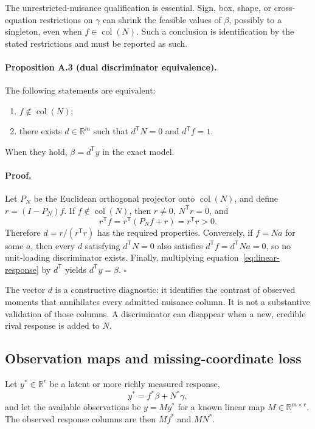 The unrestricted-nuisance qualification is essential. Sign, box, shape, or
cross-equation restrictions on \(\gamma\) can shrink the feasible values of
\(\beta\), possibly to a singleton, even when \(f\in\operatorname{col}(N)\).
Such a conclusion is identification by the stated restrictions and must be
reported as such.

\paragraph{Proposition A.3 (dual discriminator equivalence).}
The following statements are equivalent:
\begin{enumerate}
  \item \(f\notin\operatorname{col}(N)\);
  \item there exists \(d\in\mathbb R^m\) such that
        \(d^{\mathsf T}N=0\) and \(d^{\mathsf T}f=1\).
\end{enumerate}
When they hold, \(\beta=d^{\mathsf T}y\) in the exact model.

\paragraph{Proof.}
Let \(P_N\) be the Euclidean orthogonal projector onto
\(\operatorname{col}(N)\), and define \(r=(I-P_N)f\). If
\(f\notin\operatorname{col}(N)\), then \(r\neq0\),
\(N^{\mathsf T}r=0\), and
\[
  r^{\mathsf T}f
  =r^{\mathsf T}(P_Nf+r)
  =r^{\mathsf T}r>0.
\]
Therefore \(d=r/(r^{\mathsf T}r)\) has the required properties. Conversely,
if \(f=Na\) for some \(a\), then every \(d\) satisfying
\(d^{\mathsf T}N=0\) also satisfies \(d^{\mathsf T}f=d^{\mathsf T}Na=0\),
so no unit-loading discriminator exists. Finally, multiplying
equation~\eqref{eq:linear-response} by \(d^{\mathsf T}\) yields
\(d^{\mathsf T}y=\beta\).
\(\square\)

The vector \(d\) is a constructive diagnostic: it identifies the contrast of
observed moments that annihilates every admitted nuisance column. It is not a
substantive validation of those columns. A discriminator can disappear when a
new, credible rival response is added to \(N\).

\subsection{Observation maps and missing-coordinate loss}
\label{app:observation-map}

Let \(y^*\in\mathbb R^r\) be a latent or more richly measured response,
\begin{equation}
  y^*=f^*\beta+N^*\gamma,
  \label{eq:latent-response}
\end{equation}
and let the available observations be \(y=My^*\) for a known linear map
\(M\in\mathbb R^{m\times r}\). The observed response columns are then
\(Mf^*\) and \(MN^*\).

